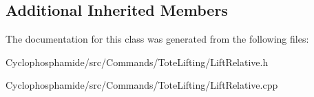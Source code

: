 \subsection*{Additional Inherited Members}


The documentation for this class was generated from the following files\+:\begin{DoxyCompactItemize}
\item 
Cyclophosphamide/src/\+Commands/\+Tote\+Lifting/Lift\+Relative.\+h\item 
Cyclophosphamide/src/\+Commands/\+Tote\+Lifting/Lift\+Relative.\+cpp\end{DoxyCompactItemize}
